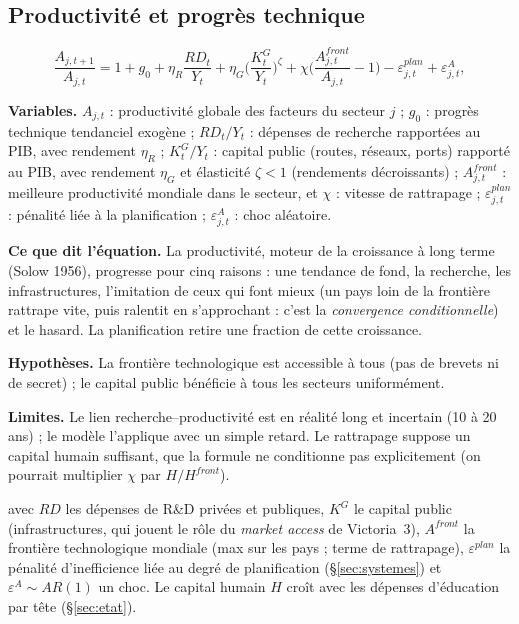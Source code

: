 \documentclass[11pt,a4paper]{article}
\newcommand{\variables}{\par\noindent\textbf{Variables.} }
\newcommand{\sens}{\par\noindent\textbf{Ce que dit l'équation.} }
\newcommand{\hyp}{\par\noindent\textbf{Hypothèses.} }
\newcommand{\limites}{\par\noindent\textbf{Limites.} }
\begin{document}
\subsection{Productivité et progrès technique}
\begin{equation}
\frac{A_{j,t+1}}{A_{j,t}} = 1 + g_0 + \eta_R \frac{RD_t}{Y_t} + \eta_G \Big(\frac{K^G_t}{Y_t}\Big)^{\zeta} + \chi\Big(\frac{A^{front}_{j,t}}{A_{j,t}} - 1\Big) - \varepsilon^{plan}_{j,t} + \varepsilon^A_{j,t},
\label{eq:tfp}
\end{equation}
\begin{lecture}
\variables $A_{j,t}$ : productivité globale des facteurs du secteur $j$ ; $g_0$ : progrès technique tendanciel exogène ; $RD_t/Y_t$ : dépenses de recherche rapportées au PIB, avec rendement $\eta_R$ ; $K^G_t/Y_t$ : capital public (routes, réseaux, ports) rapporté au PIB, avec rendement $\eta_G$ et élasticité $\zeta<1$ (rendements décroissants) ; $A^{front}_{j,t}$ : meilleure productivité mondiale dans le secteur, et $\chi$ : vitesse de rattrapage ; $\varepsilon^{plan}_{j,t}$ : pénalité liée à la planification ; $\varepsilon^A_{j,t}$ : choc aléatoire.
\sens La productivité, moteur de la croissance à long terme (Solow 1956), progresse pour cinq raisons : une tendance de fond, la recherche, les infrastructures, l'imitation de ceux qui font mieux (un pays loin de la frontière rattrape vite, puis ralentit en s'approchant : c'est la \emph{convergence conditionnelle}) et le hasard. La planification retire une fraction de cette croissance.
\hyp La frontière technologique est accessible à tous (pas de brevets ni de secret) ; le capital public bénéficie à tous les secteurs uniformément.
\limites Le lien recherche--productivité est en réalité long et incertain (10 à 20 ans) ; le modèle l'applique avec un simple retard. Le rattrapage suppose un capital humain suffisant, que la formule ne conditionne pas explicitement (on pourrait multiplier $\chi$ par $H/H^{front}$).
\end{lecture}
avec $RD$ les dépenses de R\&D privées et publiques, $K^G$ le capital public (infrastructures, qui jouent le rôle du \emph{market access} de Victoria~3), $A^{front}$ la frontière technologique mondiale (max sur les pays ; terme de rattrapage), $\varepsilon^{plan}$ la pénalité d'inefficience liée au degré de planification (\S\ref{sec:systemes}) et $\varepsilon^A \sim AR(1)$ un choc. Le capital humain $H$ croît avec les dépenses d'éducation par tête (\S\ref{sec:etat}).
\end{document}
